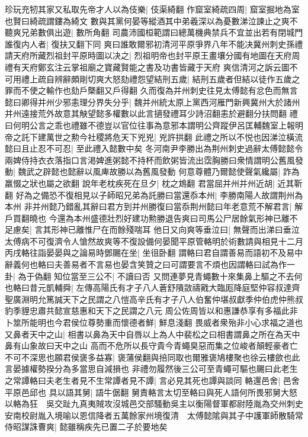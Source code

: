 珍玩充牣其家又私取先帝才人以為伎樂|{
	伎渠綺翻}
作窟室綺疏四周|{
	窟室掘地為室也賢曰綺疏謂鏤為綺文}
數與其黨何晏等縱酒其中弟羲深以為憂數涕泣諫止之爽不聽爽兄弟數俱出遊|{
	數所角翻}
司農沛國桓範謂曰總萬機典禁兵不宜並出若有閉城門誰復内人者|{
	復扶又翻下同}
爽曰誰敢爾邪初清河平原爭界八年不能决冀州刺史孫禮請天府所藏烈祖封平原時圖以决之|{
	烈祖明帝也封平原王畫壤分國有地圖在天府周禮有天府鄭玄注云掌祖廟之寶藏賢能之書及功書皆藏于天府}
爽信清河之訴云圖不可用禮上疏自辨辭頗剛切爽大怒劾禮怨望結刑五歲|{
	結刑五歲者但結以徒作五歲之罪而不使之輸作也劾戶槩翻又戶得翻}
久而復為并州刺史往見太傅懿有忿色而無言懿曰卿得并州少邪恚理分界失分乎|{
	魏并州統太原上黨西河雁門新興冀州大於諸州并州遠接荒外故意其觖望懿多權數以此言擿發禮耳少詩沼翻恚於避翻分扶問翻}
禮曰何明公言之乖也禮雖不德豈以官位往事為意邪本謂明公齊蹤伊呂匡輔魏室上報明帝之託下建萬世之勲今社稷將危天下兇兇|{
	兇許拱翻}
此禮之所以不悦也因涕泣橫流懿曰且止忍不可忍|{
	至此禮入懿數中矣}
冬河南尹李勝出為荆州刺史過辭太傅懿懿令兩婢侍持衣衣落指口言渇婢進粥懿不持杯而飲粥皆流出霑胸勝曰衆情謂明公舊風發動|{
	魏武之辟懿也懿辭以風庳故勝以為舊風發動}
何意尊體乃爾懿使聲氣纔屬|{
	詐為羸惙之狀也屬之欲翻}
說年老枕疾死在旦夕|{
	枕之鴆翻}
君當屈并州并州近胡|{
	近其靳翻}
好為之備恐不復相見以子師昭兄弟為託勝曰當還忝本州|{
	李勝南陽人故謂荆州為本州}
非并州懿乃錯亂其辭曰君方到并州勝復曰當忝荆州懿曰年老意荒不解君言|{
	解戶買翻曉也}
今還為本州盛德壯烈好建功勲勝退告爽曰司馬公尸居餘氣形神已離不足慮矣|{
	言其形神已離惟尸在而餘殘喘耳}
他日又向爽等垂泣曰|{
	無聲而出涕曰垂泣}
太傅病不可復濟令人愴然故爽等不復設備何晏聞平原管輅明於術數請與相見十二月丙戌輅往詣晏晏與之論易時鄧颺在坐|{
	坐徂卧翻}
謂輅曰君自謂善易而語初不及易中辭義何也輅曰夫善易者不言易也晏含笑贊之曰可謂要言不煩也因謂輅曰試為作一卦|{
	為于偽翻}
知位當至三公不|{
	不讀曰否}
又問連夢見青蠅數十來集鼻上驅之不去何也輅曰昔元凱輔舜|{
	左傳高陽氏有才子八人蒼舒隤敳禱戭大臨厖降庭堅仲容叔達齊聖廣淵明允篤誠天下之民謂之八愷高辛氏有才子八人伯奮仲堪叔獻季仲伯虎仲熊叔豹季貍忠肅共懿宣慈惠和天下之民謂之八元}
周公佐周皆以和惠謙恭享有多福此非卜筮所能明也今君侯位尊勢重而懷德者鮮|{
	鮮息淺翻}
畏威者衆殆非小心求福之道也又鼻者天中之山|{
	相書以鼻為天中自唇以上為人中裴松之曰相書謂鼻之所在為天中鼻有山象故曰天中之山}
高而不危所以長守貴今青蠅臭惡而集之位峻者顛輕豪者亡不可不深思也願君侯褒多益寡|{
	褒蒲侯翻與掊同取也爾雅褒鳩樓聚也徐云樓歛也此言晏據權勢揆分為多當思自減損也}
非禮勿履然後三公可至青蠅可驅也颺曰此老生之常譚輅曰夫老生者見不生常譚者見不譚|{
	言必見其死也譚與談同}
輅還邑舍|{
	邑舍平原邑邱也}
具以語其舅|{
	語牛倨翻}
舅責輅言太切至輅曰與死人語何所畏邪舅大怒以輅為狂　吳交趾九真夷賊攻沒城邑交部騷動吳主以衡陽督軍都尉陸胤為交州刺史安南校尉胤入境喻以恩信降者五萬餘家州境復清　太傅懿隂與其子中護軍師散騎常侍昭謀誅曹爽|{
	懿雖稱疾先已置二子於要地矣}


